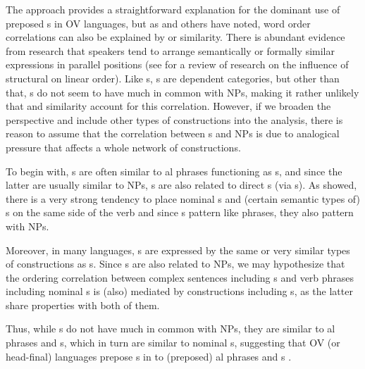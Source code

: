 \documentclass[output=paper]{langsci/langscibook}
\begin{document}
\largerpage
The  approach provides a straightforward explanation for the dominant use of preposed s in OV languages, but as \citet{Krifka1985} and others have noted, word order correlations can also be explained by  or similarity. There is abundant evidence from  research that speakers tend to arrange semantically or formally similar expressions in parallel positions (see \citealt{PickeringFerreira2008} for a review of  research on the influence of structural  on linear order). Like s, s are dependent categories, but other than that, s do not seem to have much in common with  NPs, making it rather unlikely that  and similarity account for this correlation. However, if we broaden the perspective and include other types of constructions into the analysis, there is reason to assume that the correlation between s and  NPs is due to analogical pressure that affects a whole network of constructions.


To begin with, s are often similar to al phrases functioning as s, and since the latter are usually similar to  NPs, s are also related to direct s (via s). As \citet{Dryer1992} showed, there is a very strong tendency to place nominal s and (certain semantic types of) s on the same side of the verb and since s pattern like  phrases, they also pattern with  NPs. 

Moreover, in many languages, s are expressed by the same or very similar types of constructions as s. Since s are also related to  NPs, we may hypothesize that the ordering correlation between complex sentences including s and verb phrases including nominal s is (also) mediated by constructions including s, as the latter share properties with both of them.

Thus, while s do not have much in common with  NPs, they are similar to al phrases and s, which in turn are similar to nominal s, suggesting that OV (or head-final) languages prepose s in  to (preposed) al phrases and s .
\end{document}
